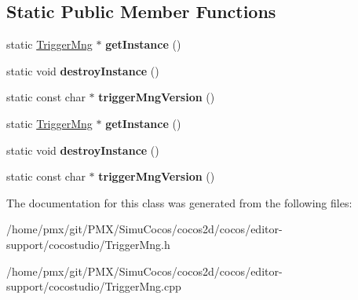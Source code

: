 \subsection*{Static Public Member Functions}
\begin{DoxyCompactItemize}
\item 
\mbox{\label{classcocostudio_1_1TriggerMng_ad3aacb9752d093a96aaec9849435d346}} 
static \hyperlink{classcocostudio_1_1TriggerMng}{Trigger\+Mng} $\ast$ {\bfseries get\+Instance} ()
\item 
\mbox{\label{classcocostudio_1_1TriggerMng_a72a9706a3f79b28426334940e463e3be}} 
static void {\bfseries destroy\+Instance} ()
\item 
\mbox{\label{classcocostudio_1_1TriggerMng_a26b3f7b8e7daf988150e6672d2689a3b}} 
static const char $\ast$ {\bfseries trigger\+Mng\+Version} ()
\item 
\mbox{\label{classcocostudio_1_1TriggerMng_a14855ccf0e75b7a250c1ede8da6d6d46}} 
static \hyperlink{classcocostudio_1_1TriggerMng}{Trigger\+Mng} $\ast$ {\bfseries get\+Instance} ()
\item 
\mbox{\label{classcocostudio_1_1TriggerMng_ae56874482e06d92523b0d07e771d850b}} 
static void {\bfseries destroy\+Instance} ()
\item 
\mbox{\label{classcocostudio_1_1TriggerMng_a843608262327eb7187cb928f40a15d0c}} 
static const char $\ast$ {\bfseries trigger\+Mng\+Version} ()
\end{DoxyCompactItemize}


The documentation for this class was generated from the following files\+:\begin{DoxyCompactItemize}
\item 
/home/pmx/git/\+P\+M\+X/\+Simu\+Cocos/cocos2d/cocos/editor-\/support/cocostudio/Trigger\+Mng.\+h\item 
/home/pmx/git/\+P\+M\+X/\+Simu\+Cocos/cocos2d/cocos/editor-\/support/cocostudio/Trigger\+Mng.\+cpp\end{DoxyCompactItemize}
